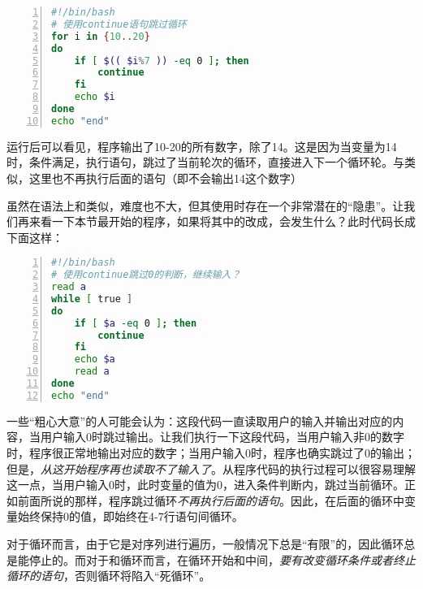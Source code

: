 \begin{lstlisting}[language=bash,numbers=left,caption={continue\_example2}]
#!/bin/bash
# 使用continue语句跳过循环
for i in {10..20}
do
    if [ $(( $i%7 )) -eq 0 ]; then
        continue
    fi
    echo $i
done
echo "end" 
\end{lstlisting}

运行后可以看见，程序输出了10-20的所有数字，除了14。这是因为当变量为14时，条件满足，执行语句，跳过了当前轮次的循环，直接进入下一个循环轮。与类似，这里也不再执行后面的语句（即不会输出14这个数字）

虽然在语法上和类似，难度也不大，但其使用时存在一个非常潜在的“隐患”。让我们再来看一下本节最开始的程序，如果将其中的改成，会发生什么？此时代码长成下面这样：

\begin{lstlisting}[language=bash,numbers=left,caption={continue\_example}]
#!/bin/bash
# 使用continue跳过0的判断，继续输入？
read a
while [ true ]
do
    if [ $a -eq 0 ]; then
        continue
    fi
    echo $a
    read a
done
echo "end"
\end{lstlisting}

一些“粗心大意”的人可能会认为：这段代码一直读取用户的输入并输出对应的内容，当用户输入0时跳过输出。让我们执行一下这段代码，当用户输入非0的数字时，程序很正常地输出对应的数字；当用户输入0时，程序也确实跳过了0的输出；但是，\emph{从这开始程序再也读取不了输入了}。从程序代码的执行过程可以很容易理解这一点，当用户输入0时，此时变量的值为0，进入条件判断内，跳过当前循环。正如前面所说的那样，程序跳过循环\emph{不再执行后面的语句}。因此，在后面的循环中变量始终保持0的值，即始终在4-7行语句间循环。

\begin{attention}
    对于循环而言，由于它是对序列进行遍历，一般情况下总是“有限”的，因此循环总是能停止的。而对于和循环而言，在循环开始和中间，\emph{要有改变循环条件或者终止循环的语句}，否则循环将陷入“死循环”。
\end{attention}





